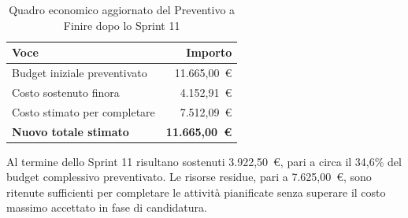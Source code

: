 \begin{table}[H]
\centering
\renewcommand{\arraystretch}{1.3}
\begin{tabular}{l r}
\toprule
\textbf{Voce} & \textbf{Importo} \\
\midrule
Budget iniziale preventivato  & 11.665{,}00~\euro \\
Costo sostenuto finora        & 4.152{,}91~\euro \\
Costo stimato per completare  & 7.512{,}09~\euro \\
\midrule
\textbf{Nuovo totale stimato} & \textbf{11.665{,}00~\euro} \\
\bottomrule
\end{tabular}
\caption{Quadro economico aggiornato del Preventivo a Finire dopo lo Sprint 11}
\end{table}

Al termine dello Sprint 11 risultano sostenuti 3.922,50~\euro, pari a circa il 34,6\% del budget complessivo 
preventivato. Le risorse residue, pari a 7.625,00~\euro, sono ritenute sufficienti per completare le attività 
pianificate senza superare il costo massimo accettato in fase di candidatura.